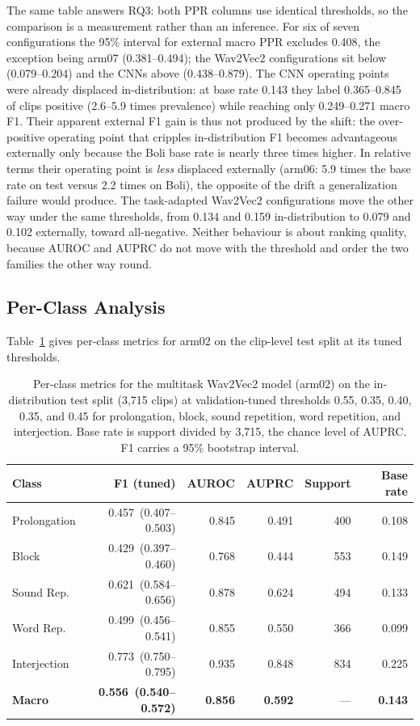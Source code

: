 \documentclass[a4paper,orivec]{llncs}
\newcommand{\ci}[1]{{\scriptsize\,(#1)}}
\begin{document}
The same table answers RQ3: both PPR columns use identical thresholds, so the
comparison is a measurement rather than an inference. For six of seven
configurations the 95\% interval for external macro PPR excludes 0.408, the
exception being arm07 (0.381--0.494); the Wav2Vec2 configurations sit below
(0.079--0.204) and the CNNs above (0.438--0.879). The CNN operating points were
already displaced in-distribution: at base rate 0.143 they label 0.365--0.845 of
clips positive (2.6--5.9 times prevalence) while reaching only 0.249--0.271 macro
F1. Their apparent external F1 gain is thus not produced by the shift: the
over-positive operating point that cripples in-distribution F1 becomes
advantageous externally only because the Boli base rate is nearly three times
higher. In relative terms their operating point is \emph{less} displaced
externally (arm06: 5.9 times the base rate on test versus 2.2 times on Boli), the
opposite of the drift a generalization failure would produce. The task-adapted
Wav2Vec2 configurations move the other way under the same thresholds, from 0.134
and 0.159 in-distribution to 0.079 and 0.102 externally, toward all-negative.
Neither behaviour is about ranking quality, because AUROC and AUPRC do not move
with the threshold and order the two families the other way round.


\subsection{Per-Class Analysis}
Table~\ref{tab:perclass} gives per-class metrics for arm02 on the
clip-level test split at its tuned thresholds.

\begin{table}[!htbp]
\caption{Per-class metrics for the multitask Wav2Vec2 model (arm02) on the
in-distribution test split (3{,}715 clips) at validation-tuned thresholds 0.55,
0.35, 0.40, 0.35, and 0.45 for prolongation, block, sound repetition, word
repetition, and interjection. Base rate is support divided by 3{,}715, the chance
level of AUPRC. F1 carries a 95\% bootstrap interval.}
\label{tab:perclass}
\centering
\footnotesize
\setlength{\tabcolsep}{3pt}
\renewcommand{\arraystretch}{0.9}
\begin{tabular}{lrrrrr}
\hline
Class & F1 (tuned) & AUROC & AUPRC & Support & Base rate\\
\hline
Prolongation & 0.457 \ci{0.407--0.503} & 0.845 & 0.491 & 400 & 0.108\\
Block & 0.429 \ci{0.397--0.460} & 0.768 & 0.444 & 553 & 0.149\\
Sound Rep. & 0.621 \ci{0.584--0.656} & 0.878 & 0.624 & 494 & 0.133\\
Word Rep. & 0.499 \ci{0.456--0.541} & 0.855 & 0.550 & 366 & 0.099\\
Interjection & 0.773 \ci{0.750--0.795} & 0.935 & 0.848 & 834 & 0.225\\
\hline
\textbf{Macro} & \textbf{0.556 \ci{0.540--0.572}} & \textbf{0.856} & \textbf{0.592} & --- & \textbf{0.143}\\
\hline
\end{tabular}
\end{table}
\end{document}
